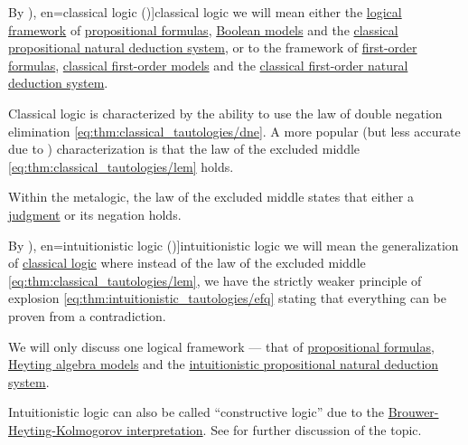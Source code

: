\begin{definition}\label{def:classical_logic}\mimprovised
  By \term[ru=классическая логика (\cite[58]{ШеньВерещагин2017Языки}), en=classical logic (\cite[8]{TroelstraSchwichtenberg2000})]{classical logic} we will mean either the \hyperref[def:logical_framework]{logical framework} of \hyperref[def:propositional_syntax/formula]{propositional formulas}, \hyperref[def:propositional_model]{Boolean models} and the \hyperref[def:classical_propositional_deduction_system]{classical propositional natural deduction system}, or to the framework of \hyperref[def:first_order_syntax/formula]{first-order formulas}, \hyperref[def:first_order_model]{classical first-order models} and the \hyperref[def:first_order_natural_deduction_system]{classical first-order natural deduction system}.
\end{definition}
\begin{comments}
  \item Classical logic is characterized by the ability to use the law of double negation elimination \eqref{eq:thm:classical_tautologies/dne}. A more popular (but less accurate due to ) characterization is that the law of the excluded middle \eqref{eq:thm:classical_tautologies/lem} holds.
  \item Within the metalogic, the law of the excluded middle states that either a \hyperref[con:judgment]{judgment} or its negation holds.
\end{comments}

\begin{definition}\label{def:intuitionistic_logic}\mimprovised
  By \term[ru=интуиционисткая логика (\cite[58]{ШеньВерещагин2017Языки}), en=intuitionistic logic (\cite[8]{TroelstraSchwichtenberg2000})]{intuitionistic logic} we will mean the generalization of \hyperref[def:classical_logic]{classical logic} where instead of the law of the excluded middle \eqref{eq:thm:classical_tautologies/lem}, we have the strictly weaker principle of explosion \eqref{eq:thm:intuitionistic_tautologies/efq} stating that everything can be proven from a contradiction.

  We will only discuss one logical framework --- that of \hyperref[def:propositional_syntax/formula]{propositional formulas}, \hyperref[def:propositional_heyting_algebra_semantics]{Heyting algebra models} and the \hyperref[def:intuitionistic_propositional_deduction_systems]{intuitionistic propositional natural deduction system}.
\end{definition}
\begin{comments}
  \item Intuitionistic logic can also be called \enquote{constructive logic} due to the \hyperref[con:brouwer_heyting_kolmogorov_interpretation]{Brouwer-Heyting-Kolmogorov interpretation}. See  for further discussion of the topic.
\end{comments}

